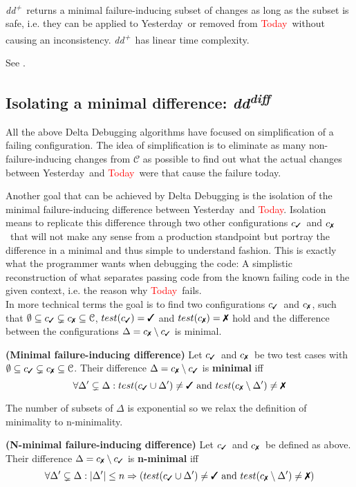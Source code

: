 \documentclass[a4paper,UKenglish]{lipics-v2018}
\newcommand{\ddp}{\textit{dd\textsuperscript{+}}}
\newcommand{\dddiff}{\textit{dd\textsuperscript{diff}}}
\newcommand{\green}[1]{\textcolor{td-green}{#1}}
\newcommand{\red}[1]{\textcolor{red}{#1}}
\newcommand{\yd}[0]{\green{Yesterday}}
\newcommand{\td}[0]{\red{Today}}
\newcommand{\C}[0]{\ensuremath{\mathcal{C}}}
\newcommand{\cmark}{\text{\ding{51}}}
\newcommand{\xmark}{\text{\ding{55}}}
\newcommand{\cpass}{\ensuremath{c_{\cmark}}}
\newcommand{\cfail}{\ensuremath{c_{\xmark}}}
\newcommand{\defsub}[1]{\textbf{(#1)} }
\begin{document}
\lemma \ddp\ returns a minimal failure-inducing subset of changes as long as the subset is safe, i.e. they can be applied to \yd\ or removed from \td\ without causing an inconsistency. \ddp\ has linear time complexity.

\proof See \cite{Zeller:1999:YMP:318774.318946}.

\subsection{Isolating a minimal difference: \dddiff}

All the above Delta Debugging algorithms have focused on simplification of a failing configuration. The idea of simplification is to eliminate as many non-failure-inducing changes from $\C$ as possible to find out what the actual changes between \yd\ and \td\ were that cause the failure today.

Another goal that can be achieved by Delta Debugging is the isolation of the minimal failure-inducing difference between \yd\ and \td. Isolation means to replicate this difference through two other configurations \cpass\ and \cfail\ that will not make any sense from a production standpoint but portray the difference in a minimal and thus simple to understand fashion. This is exactly what the programmer wants when debugging the code: A simplistic reconstruction of what separates passing code from the known failing code in the given context, i.e. the reason why \td\ fails.\\

In more technical terms the goal is to find two configurations \cpass\ and \cfail, such that $\emptyset \subseteq \cpass \subsetneq \cfail \subseteq \C$, $test(\cpass) = \cmark$ and $test(\cfail) = \xmark$ hold and the difference between the configurations $\Delta = \cfail \setminus \cpass$ is minimal.

 \label{def:minimal_difference} \defsub{Minimal failure-inducing difference} Let \cpass\ and \cfail\ be two test cases with $\emptyset \subseteq \cpass \subsetneq \cfail \subseteq \C$. Their difference $\Delta = \cfail \setminus \cpass$ is \textbf{minimal} iff \[ \forall \Delta' \subsetneq \Delta : test(\cpass \cup \Delta') \ne \cmark \text{ and } test(\cfail \setminus \Delta') \ne \xmark \]

The number of subsets of $\Delta$ is exponential so we relax the definition of minimality to n-minimality.

 \label{def:n-minimal_difference} \defsub{N-minimal failure-inducing difference} Let \cpass\ and \cfail\ be defined as above. Their difference $\Delta = \cfail \setminus \cpass$ is \textbf{n-minimal} iff \[ \forall \Delta' \subsetneq \Delta : |\Delta'| \le n \Rightarrow (test(\cpass \cup \Delta') \ne \cmark \text{ and } test(\cfail \setminus \Delta') \ne \xmark) \] 
\end{document}
